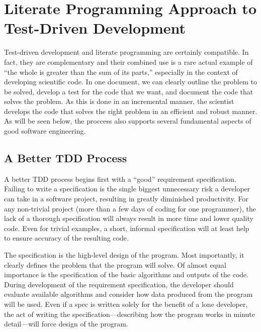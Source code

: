 \section{Literate Programming Approach to Test-Driven Development}
Test-driven development and literate programming are certainly compatible.  In fact, they are 
complementary and their combined use is a rare actual example of ``the whole is greater
than the sum of its parts,'' especially in the context of developing scientific code.  
In one document, we can clearly outline the problem to be solved, develop a test for the 
code that we want, and document the code that solves the problem. As this is done in an incremental
manner, the scientist develops the code that solves the right problem in an efficient and robust manner.
As will be seen below, the proccess also supports several fundamental aspects of good software
engineering.

\subsection{A Better TDD Process}\label{tdd-better}

A better TDD process begins first with a ``good'' requirement specification.
Failing to write a specification is the single biggest unnecessary risk a developer
can take in a software project, resulting in greatly diminished productivity. 
For any non-trivial project (more than a few days of coding for one programmer), 
the lack of a thorough specification will always result in more time and lower quality code.
Even for trivial examples, a short, informal specification will at least help to ensure
accuracy of the resulting code.

The specification is the high-level design of the program. 
Most importantly, it clearly defines the problem that the program will solve. 
Of almost equal importance is the specification of the
basic algorithms and outputs of the code. During development of the requirement specification,
the developer should evaluate available algorithms and consider how data produced from the 
program will be used.
Even if a spec is written solely for the benefit of a lone developer, the act of 
writing the specification---describing how the program works in 
minute detail---will force design of the program.

